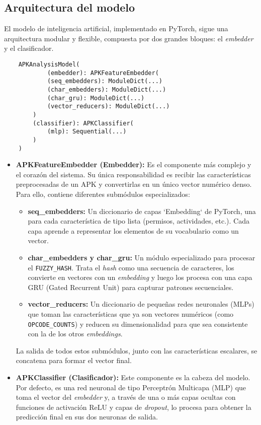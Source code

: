 \subsection*{Arquitectura del modelo}
El modelo de inteligencia artificial, implementado en PyTorch, sigue una arquitectura modular y flexible, compuesta por dos grandes bloques: el \textit{embedder} y el clasificador.

\newpage
\begin{verbatim}
	APKAnalysisModel(
			(embedder): APKFeatureEmbedder(
			(seq_embedders): ModuleDict(...)
			(char_embedders): ModuleDict(...)
			(char_gru): ModuleDict(...)
			(vector_reducers): ModuleDict(...)
		)
		(classifier): APKClassifier(
			(mlp): Sequential(...)
		)
	)
\end{verbatim}

\begin{itemize}
	\item \textbf{APKFeatureEmbedder (Embedder):} Es el componente más complejo y el corazón del sistema. Su única responsabilidad es recibir las características preprocesadas de un APK y convertirlas en un único vector numérico denso. Para ello, contiene diferentes submódulos especializados:
	\begin{itemize}
		\item \textbf{seq\_embedders:} Un diccionario de capas `Embedding` de PyTorch, una para cada característica de tipo lista (permisos, actividades, etc.). Cada capa aprende a representar los elementos de su vocabulario como un vector.
		\item \textbf{char\_embedders y char\_gru:} Un módulo especializado para procesar el \texttt{FUZZY\_HASH}. Trata el \textit{hash} como una secuencia de caracteres, los convierte en vectores con un \textit{embedding} y luego los procesa con una capa GRU (Gated Recurrent Unit) para capturar patrones secuenciales.
		\item \textbf{vector\_reducers:} Un diccionario de pequeñas redes neuronales (MLPs) que toman las características que ya son vectores numéricos (como \texttt{OPCODE\_COUNTS}) y reducen su dimensionalidad para que sea consistente con la de los otros \textit{embeddings}.
	\end{itemize}
	La salida de todos estos submódulos, junto con las características escalares, se concatena para formar el vector final.
	
	\item \textbf{APKClassifier (Clasificador):} Este componente es la cabeza del modelo. Por defecto, es una red neuronal de tipo Perceptrón Multicapa (MLP) que toma el vector del \textit{embedder} y, a través de una o más capas ocultas con funciones de activación ReLU y capas de \textit{dropout}, lo procesa para obtener la predicción final en sus dos neuronas de salida.
\end{itemize}


